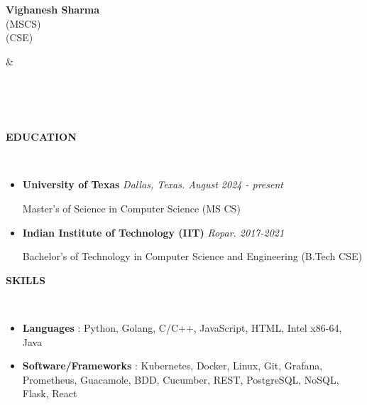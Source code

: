 \documentclass[a4paper,10pt]{article}
\newcommand{\lsep}{-0.6cm}
\newcommand{\resheading}[1]{{\small \colorbox{mygrey}{\begin{minipage}{0.975\textwidth}{\textbf{#1 \vphantom{p\^{E}}}}\end{minipage}}}}
\begin{document}

\begin{minipage}{0.5\linewidth}
\textbf{\Large Vighanesh Sharma}\\
 (MSCS)\\
 (CSE)\\
\end{minipage}
&\hspace{2.5cm}
\begin{minipage}{0.5\linewidth}
\\
\\
 \\
\end{minipage}

\resheading{\textbf{EDUCATION} }\\[\lsep]
\vspace{1.0pt}
\begin{itemize}
\item \textbf{University of Texas} \hfill \emph{Dallas, Texas. August 2024 - present}
\setlength{\itemsep}{1pt}
\setlength{\parskip}{0pt}
\setlength{\parsep}{0pt}

Master's of Science in Computer Science (MS CS)

\item \textbf{Indian Institute of Technology (IIT)} \hfill \emph{Ropar. 2017-2021}
\setlength{\itemsep}{1pt}
\setlength{\parskip}{0pt}
\setlength{\parsep}{0pt}

Bachelor's of Technology in Computer Science and Engineering (B.Tech CSE)

\end{itemize}

\resheading{\textbf{SKILLS} }\\[\lsep]
\vspace{1.0pt}
\begin{itemize}[itemsep=0.1pt]

\item \noindent \textbf{Languages} : Python, Golang, C/C++, JavaScript, HTML, Intel x86-64, Java
\item \noindent \textbf{Software/Frameworks} : Kubernetes, Docker, Linux, Git, Grafana, Prometheus, Guacamole, BDD, Cucumber, REST, PostgreSQL, NoSQL, Flask, React
\end{itemize}
\end{document}
